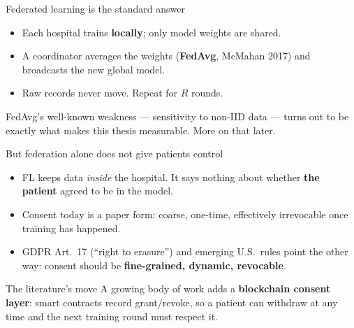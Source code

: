 \documentclass[aspectratio=169, 11pt]{beamer}
\begin{document}
\begin{frame}{Federated learning is the standard answer}
\begin{itemize}
\item Each hospital trains \textbf{locally}; only model weights are shared.
\item A coordinator averages the weights (\textbf{FedAvg}, McMahan 2017) and
      broadcasts the new global model.
\item Raw records never move. Repeat for $R$ rounds.
\end{itemize}
\vspace{0.5em}
\begin{center}
\end{center}
\vspace{0.3em}
{\footnotesize FedAvg's well-known weakness --- sensitivity to non-IID data ---
turns out to be exactly what makes this thesis measurable. More on that later.}
\end{frame}

\begin{frame}{But federation alone does not give patients control}
\begin{itemize}
\item FL keeps data \emph{inside} the hospital. It says nothing about whether
      \textbf{the patient} agreed to be in the model.
\item Consent today is a paper form: coarse, one-time, effectively
      irrevocable once training has happened.
\item GDPR Art.~17 (``right to erasure'') and emerging U.S.\ rules point the
      other way: consent should be \textbf{fine-grained, dynamic, revocable}.
\end{itemize}
\vspace{0.5em}
\begin{alertblock}{The literature's move}
A growing body of work adds a \textbf{blockchain consent layer}: smart
contracts record grant/revoke, so a patient can withdraw at any time and the
next training round must respect it.
\end{alertblock}
\end{frame}
\end{document}
